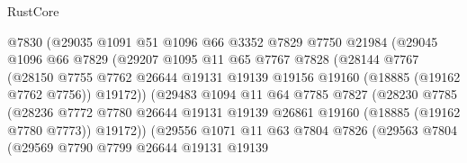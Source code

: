 \begin{lexlean}{RustCore}
\begin{coremodule}
                          @7830
                          (@29035
                            @1091
                            @51
                            @1096
                            @66
                            @3352
                            @7829
                            @7750
                            @21984
                            (@29045
                              @1096
                              @66
                              @7829
                              (@29207
                                @1095
                                @11
                                @65
                                @7767
                                @7828
                                (@28144
                                  @7767
                                  (@28150
                                    @7755
                                    @7762
                                    @26644
                                    @19131
                                    @19139
                                    @19156
                                    @19160
                                    (@18885 (@19162 @7762 @7756))
                                    @19172))
                                (@29483
                                  @1094
                                  @11
                                  @64
                                  @7785
                                  @7827
                                  (@28230
                                    @7785
                                    (@28236
                                      @7772
                                      @7780
                                      @26644
                                      @19131
                                      @19139
                                      @26861
                                      @19160
                                      (@18885 (@19162 @7780 @7773))
                                      @19172))
                                  (@29556
                                    @1071
                                    @11
                                    @63
                                    @7804
                                    @7826
                                    (@29563
                                      @7804
                                      (@29569
                                        @7790
                                        @7799
                                        @26644
                                        @19131
                                        @19139

\end{coremodule}
\end{lexlean}
